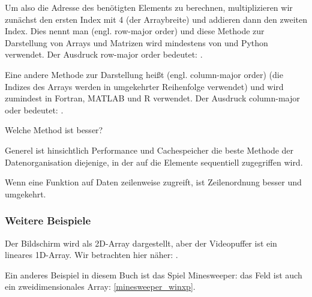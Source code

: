 Um also die Adresse des benötigten Elements zu berechnen, multiplizieren wir zunächst den ersten Index mit 4 (der
Arraybreite) und addieren dann den zweiten Index.
Dies nennt man  (engl. row-major order) und diese Methode zur Darstellung von Arrays und Matrizen
wird mindestens von \CCpp und Python verwendet.
Der Ausdruck row-major order bedeutet: .

Eine andere Methode zur Darstellung heißt  (engl. column-major order) (die Indizes des Arrays werden
in umgekehrter Reihenfolge verwendet) und wird zumindest in Fortran, MATLAB und R verwendet.
Der Ausdruck column-major oder bedeutet: .

Welche Method ist besser?

Generel ist hinsichtlich Performance und Cachespeicher die beste Methode der Datenorganisation diejenige, in der auf die
Elemente sequentiell zugegriffen wird.

Wenn eine Funktion auf Daten zeilenweise zugreift, ist Zeilenordnung besser und umgekehrt.





\subsubsection{Weitere Beispiele}
Der Bildschirm wird als 2D-Array dargestellt, aber der Videopuffer ist ein lineares 1D-Array.
Wir betrachten hier näher: .

Ein anderes Beispiel in diesem Buch ist das Spiel Minesweeper: das Feld ist auch ein zweidimensionales Array:
\ref{minesweeper_winxp}.

